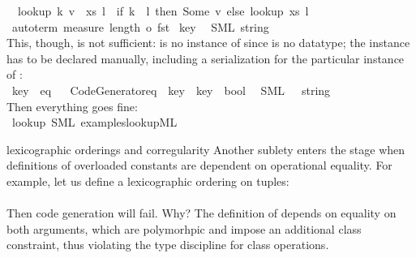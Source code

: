 \begin{isabellebody}
\begin {description}
\ \ {\isachardoublequoteopen}lookup\ {\isacharparenleft}{\isacharparenleft}k{\isacharcomma}\ v{\isacharparenright}\ {\isacharhash}\ xs{\isacharparenright}\ l\ {\isacharequal}\ {\isacharparenleft}if\ k\ {\isacharequal}\ l\ then\ Some\ v\ else\ lookup\ xs\ l{\isacharparenright}{\isachardoublequoteclose}\isanewline
{}\isamarkupfalse%
%
\isadelimproof
\ %
\endisadelimproof
%
\isatagproof
{}\isamarkupfalse%
\ {\isacharparenleft}auto{\isacharunderscore}term\ {\isachardoublequoteopen}measure\ {\isacharparenleft}length\ o\ fst{\isacharparenright}{\isachardoublequoteclose}{\isacharparenright}%
\endisatagproof
{\isafoldproof}%
%
\isadelimproof
%
\endisadelimproof
\isanewline
{}\isamarkupfalse%
\ key\isanewline
\ \ {\isacharparenleft}SML\ {\isachardoublequoteopen}string{\isachardoublequoteclose}{\isacharparenright}%
\\ This, though, is not sufficient:  is no instance
  of  since  is no datatype; the instance
  has to be declared manually, including a serialization
  for the particular instance of : \\
\isamarkupfalse%
\ key\ {\isacharcolon}{\isacharcolon}\ eq%
\isadelimproof
\ %
\endisadelimproof
%
\isatagproof
\isacommand{{\isachardot}{\isachardot}}\isamarkupfalse%
%
\endisatagproof
{\isafoldproof}%
%
\isadelimproof
%
\endisadelimproof
\isanewline
\isanewline
{}\isamarkupfalse%
\ {\isachardoublequoteopen}Code{\isacharunderscore}Generator{\isachardot}eq\ {\isasymColon}\ key\ {\isasymRightarrow}\ key\ {\isasymRightarrow}\ bool{\isachardoublequoteclose}\isanewline
\ \ {\isacharparenleft}SML\ {\isachardoublequoteopen}{\isacharbang}{\isacharparenleft}{\isacharunderscore}\ {\isacharcolon}\ string\ {\isacharequal}\ {\isacharunderscore}{\isacharparenright}{\isachardoublequoteclose}{\isacharparenright}%
\\ Then everything goes fine: \\
\isamarkupfalse%
\ lookup\ {\isacharparenleft}SML\ {\isachardoublequoteopen}examples{\isacharslash}lookup{\isachardot}ML{\isachardoublequoteclose}{\isacharparenright}%
\begin{isamarkuptext}%
%
\end{isamarkuptext}%
\isamarkuptrue%
%
\item[lexicographic orderings and corregularity] Another sublety
  enters the stage when definitions of overloaded constants
  are dependent on operational equality.  For example, let
  us define a lexicographic ordering on tuples: \\
\isanewline
\isanewline
%
\\ Then code generation will fail.  Why?  The definition
  of  depends on equality on both arguments,
  which are polymorhpic and impose an additional 
  class constraint, thus violating the type discipline
  for class operations.


\end{description}
\end{isabellebody}
